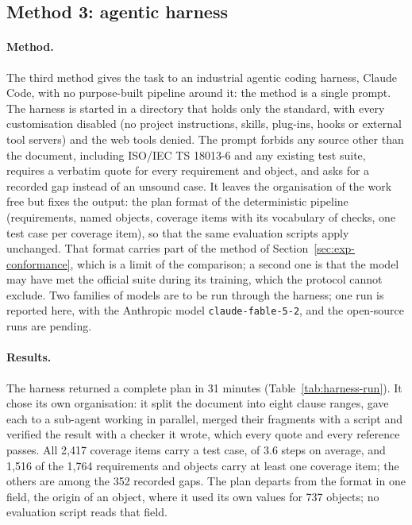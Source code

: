 \subsection{Method 3: agentic harness}
\label{sec:exp-harness}

\paragraph{Method.}
The third method gives the task to an industrial agentic coding harness,
Claude Code, with no purpose-built pipeline around it: the method is a single
prompt. The harness is started in a directory that holds only the standard,
with every customisation disabled (no project instructions, skills, plug-ins,
hooks or external tool servers) and the web tools denied. The prompt forbids
any source other than the document, including ISO/IEC TS 18013-6 and any
existing test suite, requires a verbatim quote for every requirement and
object, and asks for a recorded gap instead of an unsound case. It leaves the
organisation of the work free but fixes the output: the plan format of the
deterministic pipeline (requirements, named objects, coverage items with its
vocabulary of checks, one test case per coverage item), so that the same
evaluation scripts apply unchanged. That format carries part of the method of
Section~\ref{sec:exp-conformance}, which is a limit of the comparison; a second
one is that the model may have met the official suite during its training,
which the protocol cannot exclude. Two families of models are to be run through
the harness; one run is reported here, with the Anthropic model
\texttt{claude-fable-5-2}, and the open-source runs are pending.

\paragraph{Results.}
The harness returned a complete plan in 31 minutes
(Table~\ref{tab:harness-run}). It chose its own organisation: it split the
document into eight clause ranges, gave each to a sub-agent working in
parallel, merged their fragments with a script and verified the result with a
checker it wrote, which every quote and every reference passes. All 2,417
coverage items carry a test case, of 3.6 steps on average, and 1,516 of the
1,764 requirements and objects carry at least one coverage item; the others
are among the 352 recorded gaps. The plan departs from the format in one
field, the origin of an object, where it used its own values for 737 objects;
no evaluation script reads that field.

